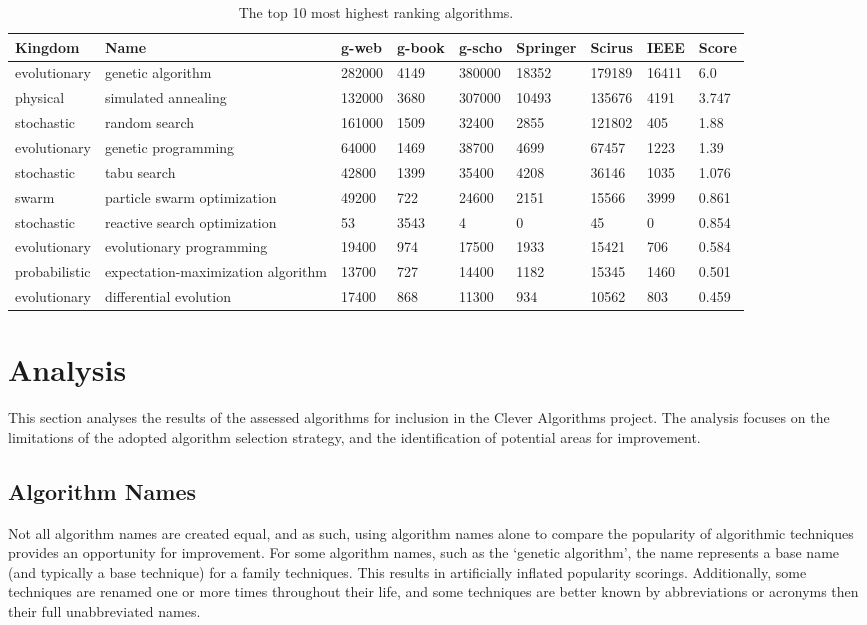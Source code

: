 \documentclass[a4paper, 11pt]{article}
\begin{document}
\begin{table}[ht]
	\centering\footnotesize
		\begin{tabularx}{\textwidth}{lXlllllll}
		\toprule
		\textbf{Kingdom} & \textbf{Name} & \textbf{g-web} & \textbf{g-book} & \textbf{g-scho} & \textbf{Springer} & \textbf{Scirus} & \textbf{IEEE} & \textbf{Score} \\ 
		\toprule
		evolutionary & genetic algorithm & 282000 & 4149 & 380000 & 18352 & 179189 & 16411 & 6.0 \\
		physical & simulated annealing & 132000 & 3680 & 307000 & 10493 & 135676 & 4191 & 3.747 \\
		stochastic & random search & 161000 & 1509 & 32400 & 2855 & 121802 & 405 & 1.88 \\
		evolutionary & genetic programming & 64000 & 1469 & 38700 & 4699 & 67457 & 1223 & 1.39 \\
		stochastic & tabu search & 42800 & 1399 & 35400 & 4208 & 36146 & 1035 & 1.076 \\
		swarm & particle swarm optimization & 49200 & 722 & 24600 & 2151 & 15566 & 3999 & 0.861 \\
		stochastic & reactive search optimization & 53 & 3543 & 4 & 0 & 45 & 0 & 0.854 \\
		evolutionary & evolutionary programming & 19400 & 974 & 17500 & 1933 & 15421 & 706 & 0.584 \\
		probabilistic & expectation-maximization algorithm & 13700 & 727 & 14400 & 1182 & 15345 & 1460 & 0.501 \\
		evolutionary & differential evolution & 17400 & 868 & 11300 & 934 & 10562 & 803 & 0.459 \\
		\bottomrule
		\end{tabularx}	
	\caption{The top 10 most highest ranking algorithms.}
	\label{tab:top}
\end{table}

% 
% 
\section{Analysis}
\label{sec:analysis}
This section analyses the results of the assessed algorithms for inclusion in the Clever Algorithms project. The analysis focuses on the limitations of the adopted algorithm selection strategy, and the identification of potential areas for improvement.

\subsection{Algorithm Names}
Not all algorithm names are created equal, and as such, using algorithm names alone to compare the popularity of algorithmic techniques provides an opportunity for improvement. For some algorithm names, such as the `genetic algorithm', the name represents a base name (and typically a base technique) for a family techniques. This results in artificially inflated popularity scorings. Additionally, some techniques are renamed one or more times throughout their life, and some techniques are better known by abbreviations or acronyms then their full unabbreviated names.
\end{document}

